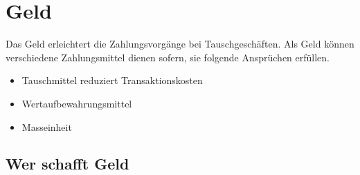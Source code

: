 \section{Geld}
Das Geld erleichtert die Zahlungsvorgänge bei Tauschgeschäften. Als Geld können verschiedene Zahlungsmittel dienen sofern, sie folgende Ansprüchen erfüllen.
\begin{itemize}
	\item Tauschmittel reduziert Transaktionskosten
	\item Wertaufbewahrungsmittel
	\item Masseinheit
\end{itemize}
\subsection{Wer schafft Geld}
